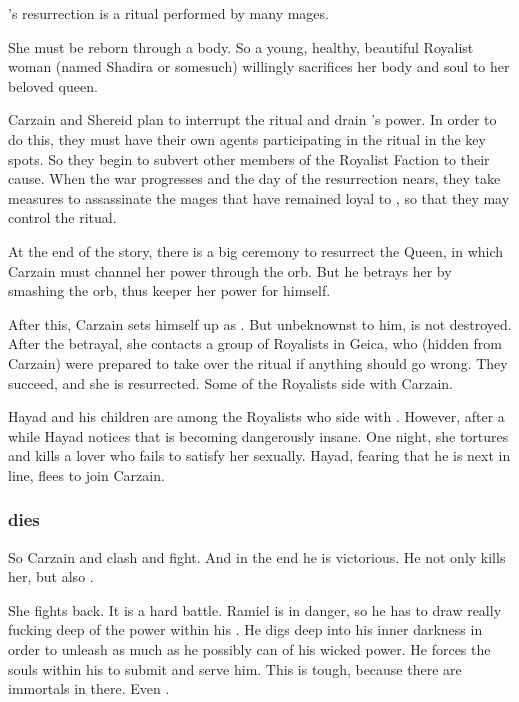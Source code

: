 \Belzir's resurrection is a ritual performed by many mages. 

She must be reborn through a \human{} body. 
So a young, healthy, beautiful Royalist woman (named Shadira or somesuch) willingly sacrifices her body and soul to her beloved queen. 

Carzain and Shereid plan to interrupt the ritual and drain \Belzir's power. 
In order to do this, they must have their own agents participating in the ritual in the key spots. 
So they begin to subvert other members of the Royalist Faction to their cause. 
When the war progresses and the day of the resurrection nears, they take measures to assassinate the mages that have remained loyal to \Belzir, so that they may control the ritual. 

At the end of the story, there is a big ceremony to resurrect the Queen, in which Carzain must channel her power through the orb. 
But he betrays her by smashing the orb, thus keeper her power for himself. 

After this, Carzain sets himself up as \caliph. 
But unbeknownst to him, \Belzir{} is not destroyed. 
After the betrayal, she contacts a group of Royalists in Geica, who (hidden from Carzain) were prepared to take over the ritual if anything should go wrong. 
They succeed, and she is resurrected. Some of the Royalists side with Carzain. 

Hayad and his children are among the Royalists who side with \Belzir. However, after a while Hayad notices that \Belzir{} is becoming dangerously insane. 
One night, she tortures and kills a lover who fails to satisfy her sexually. 
Hayad, fearing that he is next in line, flees to join Carzain. 





\subsubsection{\Shiaraid{} dies}
So Carzain and \Belzir{} clash and fight.
And in the end he is victorious. 
He not only kills her, but also . 

She fights back. 
It is a hard battle. 
Ramiel is in danger, so he has to draw really fucking deep of the power within his \carcer. 
He digs deep into his inner darkness in order to unleash as much as he possibly can of his wicked \sathariah{} power. 
He forces the souls within his \carcer{} to submit and serve him. 
This is tough, because there are immortals in there. 
Even \dragons. 

